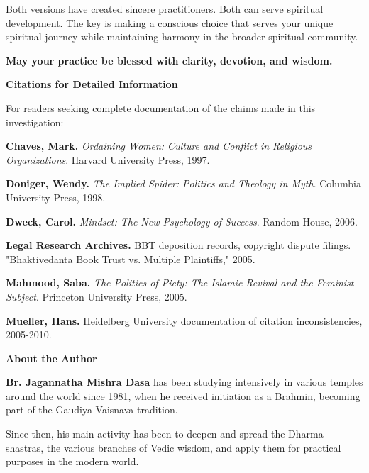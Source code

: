 \documentclass[12pt,twoside]{book}
\begin{document}
Both versions have created sincere practitioners. Both can serve spiritual development. The key is making a conscious choice that serves your unique spiritual journey while maintaining harmony in the broader spiritual community.

\textbf{May your practice be blessed with clarity, devotion, and wisdom.}

\clearpage
\pagestyle{sectionopening}
\thispagestyle{sectionopening}
\markboth{}{}
\markright{}
\vspace*{0.25\textheight}
\begin{center}
{\Huge\bfseries Citations for Detailed Information}
\end{center}
\newpage

For readers seeking complete documentation of the claims made in this investigation:


\textbf{\textbf{Chaves, Mark.}} \emph{Ordaining Women: Culture and Conflict in Religious Organizations}. Harvard University Press, 1997.

\textbf{\textbf{Doniger, Wendy.}} \emph{The Implied Spider: Politics and Theology in Myth}. Columbia University Press, 1998.

\textbf{\textbf{Dweck, Carol.}} \emph{Mindset: The New Psychology of Success}. Random House, 2006.

\textbf{\textbf{Legal Research Archives.}} BBT deposition records, copyright dispute filings. "Bhaktivedanta Book Trust vs. Multiple Plaintiffs," 2005.

\textbf{\textbf{Mahmood, Saba.}} \emph{The Politics of Piety: The Islamic Revival and the Feminist Subject}. Princeton University Press, 2005.

\textbf{\textbf{Mueller, Hans.}} Heidelberg University documentation of citation inconsistencies, 2005-2010.



\clearpage
\pagestyle{sectionopening}
\thispagestyle{sectionopening}
\markboth{}{}
\markright{}
\vspace*{0.25\textheight}
\begin{center}
{\Huge\bfseries About the Author}
\end{center}
\newpage

\textbf{\textbf{Br. Jagannatha Mishra Dasa}} has been studying intensively in various temples around the world since 1981, when he received initiation as a Brahmin, becoming part of the Gaudiya Vaisnava tradition.

Since then, his main activity has been to deepen and spread the Dharma shastras, the various branches of Vedic wisdom, and apply them for practical purposes in the modern world. 
\end{document}
